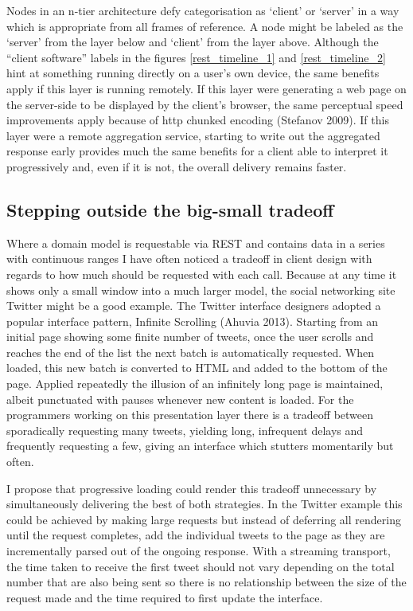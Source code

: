 \documentclass[12pt, ]{article}
\begin{document}
Nodes in an n-tier architecture defy categorisation as `client' or
`server' in a way which is appropriate from all frames of reference. A
node might be labeled as the `server' from the layer below and `client'
from the layer above. Although the ``client software'' labels in the
figures \ref{rest_timeline_1} and \ref{rest_timeline_2} hint at
something running directly on a user's own device, the same benefits
apply if this layer is running remotely. If this layer were generating a
web page on the server-side to be displayed by the client's browser, the
same perceptual speed improvements apply because of http chunked
encoding (Stefanov 2009). If this layer were a remote aggregation
service, starting to write out the aggregated response early provides
much the same benefits for a client able to interpret it progressively
and, even if it is not, the overall delivery remains faster.

\subsection{Stepping outside the big-small
tradeoff}\label{stepping-outside-the-big-small-tradeoff}

Where a domain model is requestable via REST and contains data in a
series with continuous ranges I have often noticed a tradeoff in client
design with regards to how much should be requested with each call.
Because at any time it shows only a small window into a much larger
model, the social networking site Twitter might be a good example. The
Twitter interface designers adopted a popular interface pattern,
Infinite Scrolling (Ahuvia 2013). Starting from an initial page showing
some finite number of tweets, once the user scrolls and reaches the end
of the list the next batch is automatically requested. When loaded, this
new batch is converted to HTML and added to the bottom of the page.
Applied repeatedly the illusion of an infinitely long page is
maintained, albeit punctuated with pauses whenever new content is
loaded. For the programmers working on this presentation layer there is
a tradeoff between sporadically requesting many tweets, yielding long,
infrequent delays and frequently requesting a few, giving an interface
which stutters momentarily but often.

I propose that progressive loading could render this tradeoff
unnecessary by simultaneously delivering the best of both strategies. In
the Twitter example this could be achieved by making large requests but
instead of deferring all rendering until the request completes, add the
individual tweets to the page as they are incrementally parsed out of
the ongoing response. With a streaming transport, the time taken to
receive the first tweet should not vary depending on the total number
that are also being sent so there is no relationship between the size of
the request made and the time required to first update the interface.
\end{document}
